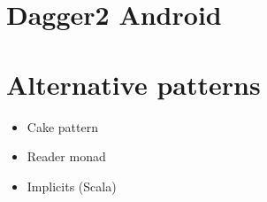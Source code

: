 \documentclass[10pt]{beamer}
\begin{document}
	\section{Dagger2 Android }
	\section{Alternative patterns}
	\begin{frame}[fragile]
		\begin{itemize}
			\item Cake pattern
			\item Reader monad 
			\item Implicits (Scala)
		\end{itemize}
	\end{frame}

% 
% 
\end{document}
